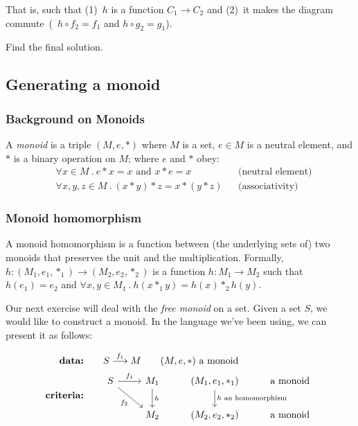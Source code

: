 That is, such that (1)~$h$ is a function $C_1 \rightarrow C_2$ and (2)~it
makes the diagram commute~(\ie~$h \circ f_2 = f_1$ and $h \circ g_2 = g_1$).

\begin{exercise}
    Find the final solution. \label{ex:dual}
\end{exercise}


\subsection{Generating a monoid}
\label{section_generate_monoid}

\subsubsection*{Background on Monoids}

A \emph{monoid} is a triple $(M, e, \ast)$ where $M$ is a set, $e \in M$ is a
neutral element, and $\ast$ is a binary operation on $M$; where $e$ and $\ast$
obey:
\begin{align*}
    & \forall x \in M\ .\
    e \ast x = x \text{ and } x \ast e = x && \text{(neutral
    element)} \\
    & \forall x,y,z \in M\ .\
    (x \ast y) \ast z = x \ast (y \ast z) && \text{(associativity)}
\end{align*}

\subsubsection*{Monoid homomorphism}

A monoid homomorphism is a function between (the underlying sets of) two
monoids that preserves the unit and the multiplication. Formally,
$h : (M_1, e_1, \ast_1) \rightarrow (M_2, e_2, \ast_2)$ is a function
$h: M_1\to M_2$ such that $h(e_1) = e_2$ and
$\forall x, y \in M_1\ .\ h(x \ast_1 y) = h(x) \ast_2 h(y)$.

Our next exercise will deal with the \emph{free monoid} on a set.
Given a set $S$, we would like to construct a monoid. In the language we've
been using, we can present it as follows:

\begin{align*}
    \textbf{data:}\qquad& S \overset{f_1}{\longrightarrow}M
    \qquad \text{$(M,e,\ast)$ a monoid}\\
    \textbf{criteria:}\qquad& \begin{tikzcd}[ampersand replacement=\&]
        S \arrow[r, "f_1"] \arrow[dr, swap, "f_2"] \&
        M_1
        \arrow[d, "h"]
        \& (M_1,e_1,\ast_1)
        \arrow[d, "\text{$h$ an homomorphism}"]
        \& \text{a monoid}
        \\
        {}
        \& M_2 \& (M_2,e_2,\ast_2) \& \text{a monoid}
    \end{tikzcd}
\end{align*}


